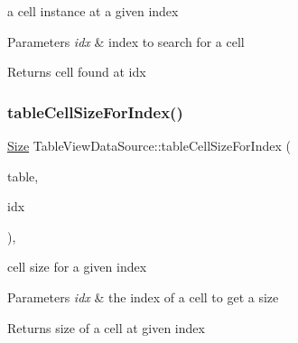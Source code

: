 a cell instance at a given index


\begin{DoxyParams}{Parameters}
{\em idx} & index to search for a cell \\
\hline
\end{DoxyParams}
\begin{DoxyReturn}{Returns}
cell found at idx 
\end{DoxyReturn}
\mbox{\label{classTableViewDataSource_a5c5afba703e5557f07309e0057ffa93d}} 
\subsubsection{\texorpdfstring{table\+Cell\+Size\+For\+Index()}{tableCellSizeForIndex()}\hspace{0.1cm}{\footnotesize\ttfamily [1/2]}}
{\footnotesize\ttfamily \hyperlink{classSize}{Size} Table\+View\+Data\+Source\+::table\+Cell\+Size\+For\+Index (\begin{DoxyParamCaption}\item[{\hyperlink{classTableView}{Table\+View} $\ast$}]{table,  }\item[{ssize\+\_\+t}]{idx }\end{DoxyParamCaption})\hspace{0.3cm}{\ttfamily [inline]}, {\ttfamily [virtual]}}

cell size for a given index


\begin{DoxyParams}{Parameters}
{\em idx} & the index of a cell to get a size \\
\hline
\end{DoxyParams}
\begin{DoxyReturn}{Returns}
size of a cell at given index 
\end{DoxyReturn}
\mbox{\label{classTableViewDataSource_ae26619b379008e9191aeedc785fff30d}} 

